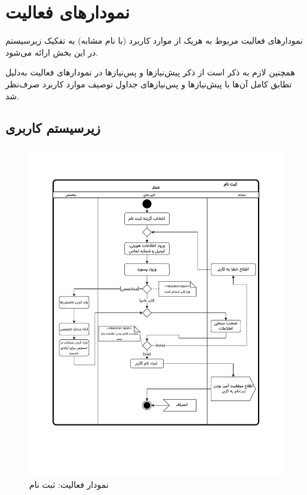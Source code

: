 \chapter{نمودارهای فعالیت}

نمودارهای فعالیت مربوط به هریک از موارد کاربرد (با نام مشابه) به تفکیک زیرسیستم در این بخش ارائه می‌شود.

همچنین لازم به ذکر است از ذکر پیش‌نیازها و پس‌نیازها در نمودارهای فعالیت به‌دلیل تطابق کامل آن‌ها با پیش‌نیاز‌ها و پس‌نیازهای جداول توصیف موارد کاربرد صرف‌نظر شد.
\newpage
\section{زیرسیستم کاربری}

\begin{figure}[ht!]
	\centering
	\includegraphics[scale=0.6, page=1]{figs/OOD-activity-signup.pdf}
	\caption{نمودار فعالیت: ثبت نام}
\end{figure}
\FloatBarrier
\newpage

